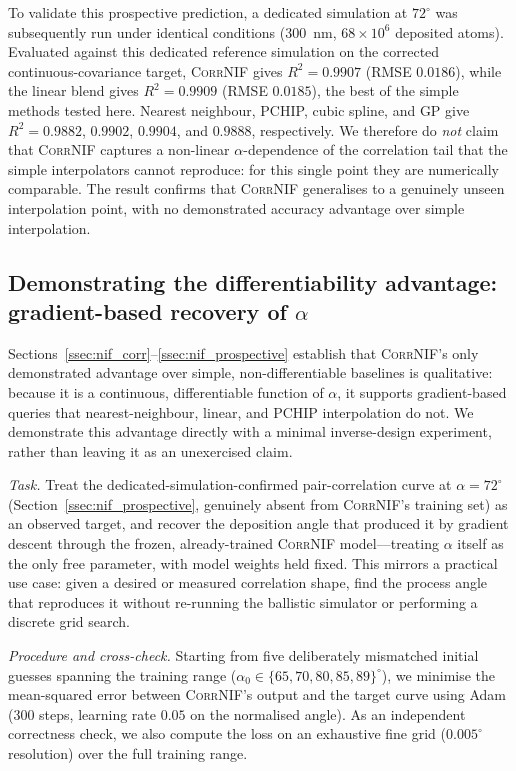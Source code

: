 \documentclass[aip,amsmath,amssymb,reprint]{revtex4-1}
\newcommand{\dang}{\ensuremath{\alpha}}
\begin{document}
To validate this prospective prediction, a dedicated simulation at
$72^{\circ}$ was subsequently run under identical conditions ($300$~nm,
$68\times10^6$ deposited atoms).
Evaluated against this dedicated reference simulation on the corrected
continuous-covariance target, \textsc{CorrNIF} gives $R^2 = 0.9907$
(RMSE $0.0186$), while the linear blend gives $R^2 = 0.9909$
(RMSE $0.0185$), the best of the simple methods tested here.  Nearest
neighbour, PCHIP, cubic spline, and GP give $R^2=0.9882$, $0.9902$,
$0.9904$, and $0.9888$, respectively.  We therefore do \emph{not} claim
that \textsc{CorrNIF} captures a non-linear $\dang$-dependence of the
correlation tail that the simple interpolators cannot reproduce: for this
single point they are numerically comparable.
The result confirms that \textsc{CorrNIF} generalises to a genuinely unseen
interpolation point, with no demonstrated accuracy advantage over simple
interpolation.

\subsection{Demonstrating the differentiability advantage: gradient-based recovery of $\dang$}
\label{ssec:nif_gradient_demo}

Sections~\ref{ssec:nif_corr}--\ref{ssec:nif_prospective} establish that
\textsc{CorrNIF}'s only demonstrated advantage over simple, non-differentiable
baselines is qualitative: because it is a continuous, differentiable function
of $\dang$, it supports gradient-based queries that nearest-neighbour,
linear, and PCHIP interpolation do not. We demonstrate this advantage
directly with a minimal inverse-design experiment, rather than leaving it as
an unexercised claim.

\textit{Task.} Treat the dedicated-simulation-confirmed pair-correlation
curve at $\dang=72^{\circ}$ (Section~\ref{ssec:nif_prospective}, genuinely
absent from \textsc{CorrNIF}'s training set) as an observed target, and
recover the deposition angle that produced it by gradient descent through
the frozen, already-trained \textsc{CorrNIF} model---treating $\dang$ itself
as the only free parameter, with model weights held fixed. This mirrors a
practical use case: given a desired or measured correlation shape, find the
process angle that reproduces it without re-running the ballistic simulator
or performing a discrete grid search.

\textit{Procedure and cross-check.} Starting from five deliberately
mismatched initial guesses spanning the training range
($\dang_0 \in \{65,70,80,85,89\}^{\circ}$), we minimise the mean-squared
error between \textsc{CorrNIF}'s output and the target curve using Adam
(300 steps, learning rate $0.05$ on the normalised angle). As an independent
correctness check, we also compute the loss on an exhaustive fine grid
($0.005^{\circ}$ resolution) over the full training range.
\end{document}
